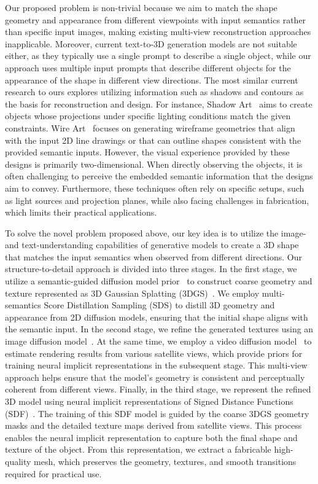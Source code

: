 Our proposed problem is non-trivial because we aim to match the shape geometry and appearance from different viewpoints with input semantics rather than specific input images, making existing multi-view reconstruction approaches inapplicable. Moreover, current text-to-3D generation models are not suitable either, as they typically use a single prompt to describe a single object, while our approach uses multiple input prompts that describe different objects for the appearance of the shape in different view directions. 
The most similar current research to ours explores utilizing information such as shadows and contours as the basis for reconstruction and design. For instance, Shadow Art~\cite{MP09} aims to create objects whose projections under specific lighting conditions match the given constraints. Wire Art~\cite{Hsiao:2018:MVWA:,qu2023dreamwire,Fabricable3DWireArt} focuses on generating wireframe geometries that align with the input 2D line drawings or that can outline shapes consistent with the provided semantic inputs. However, the visual experience provided by these designs is primarily two-dimensional. When directly observing the objects, it is often challenging to perceive the embedded semantic information that the designs aim to convey. Furthermore, these techniques often rely on specific setups, such as light sources and projection planes, while also facing challenges in fabrication, which limits their practical applications.


To solve the novel problem proposed above, our key idea is to utilize the image- and text-understanding capabilities of generative models to create a 3D shape that matches the input semantics when observed from different directions. 
Our structure-to-detail approach is divided into three stages. 
In the first stage, we utilize a semantic-guided diffusion model prior~\cite{poole2022dreamfusion,tang2023dreamgaussian} to construct coarse geometry and texture represented as 3D Gaussian Splatting (3DGS)~\cite{3DGauss}. We employ multi-semantics Score Distillation Sampling (SDS) to distill 3D geometry and appearance from 2D diffusion models, ensuring that the initial shape aligns with the semantic input. In the second stage, we refine the generated textures using an image diffusion model~\cite{SUPIR}. At the same time, we employ a video diffusion model~\cite{sun2024dimensionx} to estimate rendering results from various satellite views, which provide priors for training neural implicit representations in the subsequent stage. This multi-view approach helps ensure that the model's geometry is consistent and perceptually coherent from different views. Finally, in the third stage, we represent the refined 3D model using neural implicit representations of Signed Distance Functions (SDF)~\cite{PFS*19,WLL*21}. The training of this SDF model is guided by the coarse 3DGS geometry masks and the detailed texture maps derived from satellite views. This process enables the neural implicit representation to capture both the final shape and texture of the object. From this representation, we extract a fabricable high-quality mesh, which preserves the geometry, textures, and smooth transitions required for practical use.


